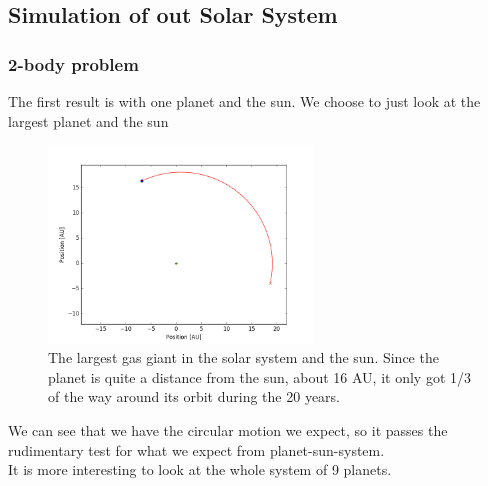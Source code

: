 \documentclass[a4paper, 10pt]{article}
\begin{document}
\subsection{Simulation of out Solar System}
\subsubsection{2-body problem}

The first result is with one planet and the sun. We choose to just look at the largest planet and the sun


\begin{figure}[H]
\begin{center}
\includegraphics[width = 70mm]{part2onePlanet.png}
\caption{The largest gas giant in the solar system and the sun. Since the planet is quite a distance from the sun, about 16 AU, it only got 1/3 of the way around its orbit during the 20 years.}
\end{center}
\end{figure}

We can see that we have the circular motion we expect, so it passes the rudimentary test for what we expect from planet-sun-system. \\ 

It is more interesting to look at the whole system of 9 planets.
\end{document}

